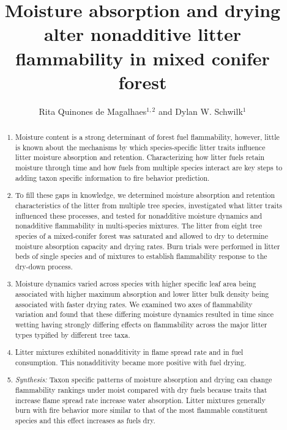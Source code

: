 \documentclass[letterpaper,12pt]{article}
\title{Moisture absorption and drying alter nonadditive litter flammability
  in mixed conifer forest}
\author{Rita Quinones de Magalhaes$^{1,2}$ and Dylan W. Schwilk$^1$}
\begin{document}
\maketitle

\begin{abstract}
  \noindent \begin{enumerate}
    
      \item Moisture content is a strong determinant of forest fuel
    flammability, however, little is known about the mechanisms by which
    species-specific litter traits influence litter moisture absorption and
    retention. Characterizing how litter fuels retain moisture through time and
    how fuels from multiple species interact are key steps to adding taxon
    specific information to fire behavior prediction.

      \item To fill these gaps in knowledge, we determined moisture absorption
    and retention characteristics of the litter from multiple tree species,
    investigated what litter traits influenced these processes, and tested for
    nonadditive moisture dynamics and nonadditive flammability in multi-species
    mixtures. The litter from eight tree species of a mixed-conifer forest was
    saturated and allowed to dry to determine moisture absorption capacity and
    drying rates. Burn trials were performed in litter beds of single species
    and of mixtures to establish flammability response to the dry-down process.
    
      \item Moisture dynamics varied across species with higher specific leaf
    area being associated with higher maximum absorption and lower litter bulk
    density being associated with faster drying rates. We examined two axes of
    flammability variation and found that these differing moisture dynamics
    resulted in time since wetting having strongly differing effects on
    flammability across the major litter types typified by different tree taxa.

      \item Litter mixtures exhibited nonadditivity in flame spread rate and
    in fuel consumption. This nonadditivity became more positive with fuel
    drying.
    
      \item \emph{Synthesis:} Taxon specific patterns of moisture absorption
    and drying can change flammability rankings under moist compared with dry
    fuels because traits that increase flame spread rate increase water
    absorption. Litter mixtures generally burn with fire behavior more similar
    to that of the most flammable constituent species and this effect increases
    as fuels dry.
    
  \end{enumerate}
\end{abstract}
\end{document}
